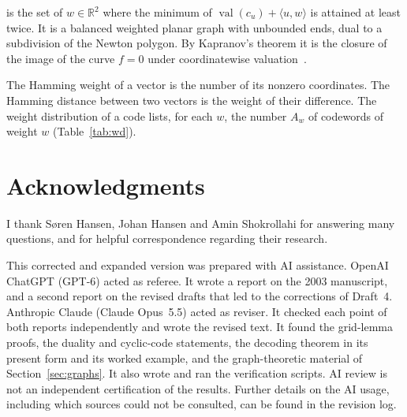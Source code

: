 \documentclass[12pt,letterpaper]{article}
\numberwithin{equation}{section}
\theoremstyle{definition}
\theoremstyle{remark}
\newcommand{\R}{\mathbb{R}}
\begin{document}
\begin{description}[leftmargin=1.5em,labelindent=0pt,style=nextline]
is the set of $w\in\R^2$ where the minimum of
$\operatorname{val}(c_u)+\langle u,w\rangle$ is attained at least twice. It is a
balanced weighted planar graph with unbounded ends, dual to a subdivision of
the Newton polygon. By Kapranov's theorem it is the closure of the image of
the curve $f=0$ under coordinatewise valuation~\cite{MS15}.
\item[Weight] The Hamming weight of a vector is the number of its nonzero
coordinates. The Hamming distance between two vectors is the weight of their
difference. The weight distribution of a code lists, for each $w$, the number
$A_w$ of codewords of weight $w$ (Table~\ref{tab:wd}).
\end{description}

\section*{Acknowledgments}

I thank S{\o}ren Hansen, Johan Hansen and Amin Shokrollahi for answering many
questions, and for helpful correspondence regarding their research.

This corrected and expanded version was prepared with AI assistance. OpenAI
ChatGPT (GPT-6) acted as referee. It wrote a report on the 2003 manuscript,
and a second report on the revised drafts that led to the corrections of
Draft~4. Anthropic Claude (Claude Opus~5.5) acted as reviser. It checked each
point of both reports independently and wrote the revised text. It found the grid-lemma
proofs, the duality and cyclic-code statements, the decoding theorem in its
present form and its worked example, and the graph-theoretic material of
Section~\ref{sec:graphs}. It also wrote and ran the verification scripts. AI
review is not an independent certification of the results. Further details on
the AI usage, including which sources could not be consulted, can be found in
the revision log.
\end{document}
